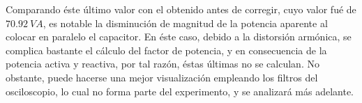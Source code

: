         Comparando éste último valor con el obtenido antes de corregir, 
        cuyo valor fué de $70.92~VA$, es notable la disminución de magnitud 
        de la potencia aparente al colocar en paralelo el capacitor.
        En éste caso, debido a la distorsión armónica, se complica bastante el 
        cálculo del factor de potencia, y en consecuencia de la potencia 
        activa y reactiva, por tal razón, éstas últimas no se calculan. No obstante, puede hacerse una mejor visualización 
        empleando los filtros del osciloscopio, lo cual no forma parte del 
        experimento, y se analizará más adelante.





   
